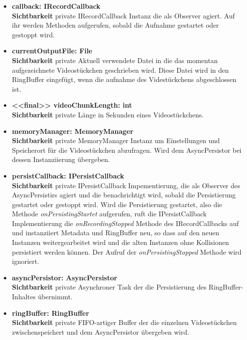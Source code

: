 \begin{itemize}
\item \textbf{callback: IRecordCallback} \hfill\\ 
\textbf{Sichtbarkeit} private \newline
IRecordCallback Instanz die als Observer agiert. Auf ihr werden Methoden aufgerufen, sobald die Aufnahme gestartet oder gestoppt wird.

\item \textbf{currentOutputFile: File} \hfill\\ 
\textbf{Sichtbarkeit} private \newline
Aktuell verwendete Datei in die das momentan aufgezeichnete Videostückchen geschrieben wird. Diese Datei wird in den RingBuffer eingefügt, wenn die aufnahme des Videstückchens abgeschlossen ist.

\item \textbf{<<final>> videoChunkLength: int} \hfill\\ 
\textbf{Sichtbarkeit} private \newline
Länge in Sekunden eines Videostückchens.

\item \textbf{memoryManager: MemoryManager} \hfill\\ 
\textbf{Sichtbarkeit} private \newline
MemoryManager Instanz um Einstellungen und Speicherort für die Videostückchen abzufragen. Wird dem AsyncPersistor bei dessen Instanziierung übergeben.

\item \textbf{persistCallback: IPersistCallback} \hfill\\ 
\textbf{Sichtbarkeit} private \newline
IPersistCallback Impementierung, die als Observer des AsyncPersistirs agiert und die benachrichtigt wird, sobald die Persistierung gestartet oder gestoppt wird. Wird die Persistierung gestartet, also die Methode \textit{onPersistingStartet} aufgerufen, ruft die IPersistCallback Implementierung die \textit{onRecordingStopped} Methode des IRecordCallbacks auf und instanziiert Metadata und RingBuffer neu, so dass auf den neuen Instanzen weitergearbeitet wird und die alten Instanzen ohne Kollisionen persistiert werden können. Der Aufruf der \textit{onPersistingStopped} Methode wird ignoriert.

\item \textbf{asyncPersistor: AsyncPersistor} \hfill\\ 
\textbf{Sichtbarkeit} private \newline
Asynchroner Task der die Persistierung des RingBuffer-Inhaltes übernimmt.

\item \textbf{ringBuffer: RingBuffer} \hfill\\ 
\textbf{Sichtbarkeit} private \newline
FIFO-artiger Buffer der die einzelnen Videostückchen zwischenspeichert und dem AsyncPersistor übergeben wird.

\end{itemize}

